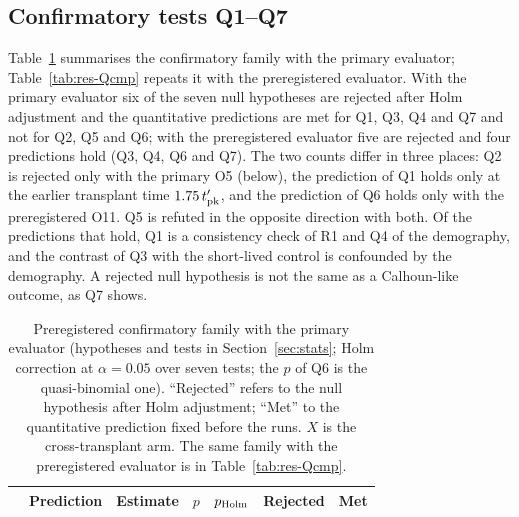 \subsection{Confirmatory tests Q1--Q7}
\label{sec:res-Q}

Table~\ref{tab:res-Q} summarises the confirmatory family with the primary evaluator; Table~\ref{tab:res-Qcmp}
repeats it with the preregistered evaluator. With the primary evaluator six
of the seven null hypotheses are rejected after Holm adjustment and the quantitative predictions are met for Q1, Q3,
Q4 and Q7 and not for Q2, Q5 and Q6; with the preregistered evaluator five are rejected and four predictions hold
(Q3, Q4, Q6 and Q7). The two counts differ in three places: Q2 is rejected only with the primary O5 (below), the
prediction of Q1 holds only at the earlier transplant time $1.75\,t'_{\rm pk}$, and the prediction of Q6 holds only
with the preregistered O11. Q5 is refuted in the opposite direction with both. Of the predictions that hold, Q1 is a
consistency check of R1 and Q4 of the demography, and the contrast of Q3 with the short-lived control is confounded by the
demography. A rejected null hypothesis is not the same as a Calhoun-like outcome, as Q7 shows.

\begin{table}[t]
  \centering
  \caption{Preregistered confirmatory family with the primary evaluator (hypotheses and tests in
  Section~\ref{sec:stats}; Holm correction at $\alpha=0.05$ over seven tests; the $p$ of Q6 is the quasi-binomial
  one). ``Rejected'' refers to the null hypothesis after Holm adjustment; ``Met'' to the quantitative prediction
  fixed before the runs. $X$ is the cross-transplant arm. The same family with the preregistered evaluator is in
  Table~\ref{tab:res-Qcmp}.}
  \label{tab:res-Q}
  \footnotesize
  \setlength{\tabcolsep}{4pt}
  \begin{tabular}{@{}lp{4.0cm}p{5.4cm}llcc@{}}
    \toprule
    & Prediction & Estimate & $p$ & $p_{\rm Holm}$ & Rejected & Met \\
    \midrule
    
  \end{tabular}
\end{table}

